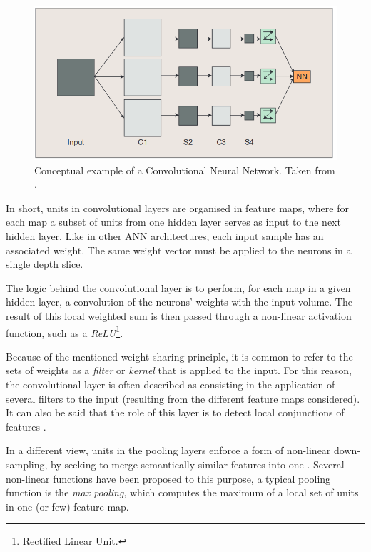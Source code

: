 \documentclass[9pt,journal,compsoc]{IEEEtran}
\begin{document}
\begin{figure}[ht]
	\centering
	\includegraphics[scale=0.25]{Convolutional_Neural_Net.png}
	\caption{Conceptual example of a Convolutional Neural Network. Taken from \cite{arel2010deep}.}
	\label{convolutional_neural_net}
\end{figure}

In short, units in convolutional layers are organised in feature maps, where for each map a subset of units from one hidden layer serves as input to the next hidden layer. Like in other ANN architectures, each input sample has an associated weight. The same weight vector must be applied to the neurons in a single depth slice.

The logic behind the convolutional layer is to perform, for each map in a given hidden layer, a convolution of the neurons' weights with the input volume. The result of this local weighted sum is then passed through a non-linear activation function, such as a \emph{ReLU}\footnote{Rectified Linear Unit.}.

Because of the mentioned weight sharing principle, it is common to refer to the sets of weights as a \emph{filter} or \emph{kernel} that is applied to the input. For this reason, the convolutional layer is often described as consisting in the application of several filters to the input (resulting from the different feature maps considered). It can also be said that the role of this layer is to detect local conjunctions of features \cite{lecun2015deep}.

In a different view, units in the pooling layers enforce a form of non-linear down-sampling, by seeking to merge semantically similar features into one \cite{lecun2015deep}. Several non-linear functions have been proposed to this purpose, a typical pooling function is the \emph{max pooling}, which computes the maximum of a local set of units in one (or few) feature map.
\end{document}
